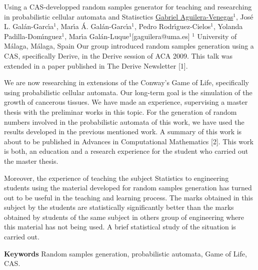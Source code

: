 


\begin{abstract_online}{Using a CAS-developped random samples generator for teaching and researching in probabilistic cellular automata and Statisctics}{%
        \underline{Gabriel Aguilera-Venegas}$^{1}$, Jos\'e L. Gal\'an-Garc\'{\i}a$^{1}$, Mar\'{\i}a \'A. Gal\'an-Garc\'{\i}a$^{1}$, Pedro Rodr\'{\i}guez-Cielos$^{1}$, Yolanda Padilla-Dom\'{\i}nguez$^{1}$, Mar\'\i a Gal\'an-Luque$^{1}$}{[gaguilera@uma.es]
        }{%
 $^1$ University of M\'alaga, M\'alaga, Spain%
}
Our group introduced random samples generation using a CAS, specifically Derive, in the Derive session of ACA 2009. This talk was extended in a paper published in The Derive Newsletter [1].

We are now researching in extensions of the Conway's Game of Life, specifically using probabilistic cellular automata. Our long-term goal is the simulation of the growth of cancerous tissues. We have made an experience, supervising a master thesis with the preliminar works in this topic. For the generation of random numbers involved in the probabilistic automata of this work, we have used the results developed  in the previous mentioned work. A summary of this work is about to be published in Advances in Computational Mathematics [2]. This work is both, an education and a research experience for the student who carried out the master thesis.

Moreover, the experience of teaching the subject Statistics to engineering students using the material developed for random samples generation has turned out to be useful in the teaching and learning process. The marks obtained in this subject by the students are statistically significantly better than the marks obtained by students of the same subject in others group of engineering where this material has not being used. A brief statistical study of the situation is carried out.


\textbf{Keywords} \newline{} Random samples generation, probabilistic automata, Game of Life, CAS.


\end{abstract_online}
